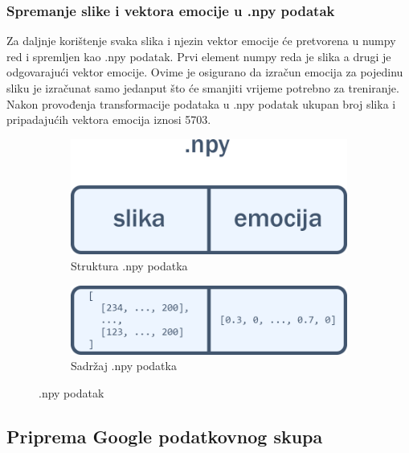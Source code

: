 \documentclass[times, utf8, zavrsni,numeric,pstricks]{fer}
\begin{document}
\subsubsection{Spremanje slike i vektora emocije u .npy podatak}\label{self:npy_save}
Za daljnje korištenje svaka slika i njezin vektor emocije će pretvorena u numpy red \cite{numpy_array} i spremljen kao .npy podatak. Prvi element numpy reda je slika a drugi je odgovarajući vektor emocije. Ovime je osigurano da izračun emocija za pojedinu sliku je izračunat samo jedanput što će smanjiti vrijeme potrebno za treniranje. Nakon provođenja transformacije podataka u .npy podatak ukupan broj slika i pripadajućih vektora emocija iznosi 5703. 



\begin{figure}[H]\label{fig:npy_array}
	\begin{subfigure}[b]{0.5\linewidth}
	  	\centering
		\includegraphics[width=\linewidth]{numpy_slika_emocija.png}
		\caption{Struktura .npy podatka}		
	\end{subfigure}
	\begin{subfigure}[b]{0.5\linewidth}
	  	\centering
		\includegraphics[width=\linewidth]{numpy_imgdata_emo.png}
		\caption{Sadržaj .npy podatka}
	\end{subfigure}	
	\caption{.npy podatak}	
\end{figure}


\subsection{Priprema Google podatkovnog skupa}\label{priprema_google}
\end{document}
